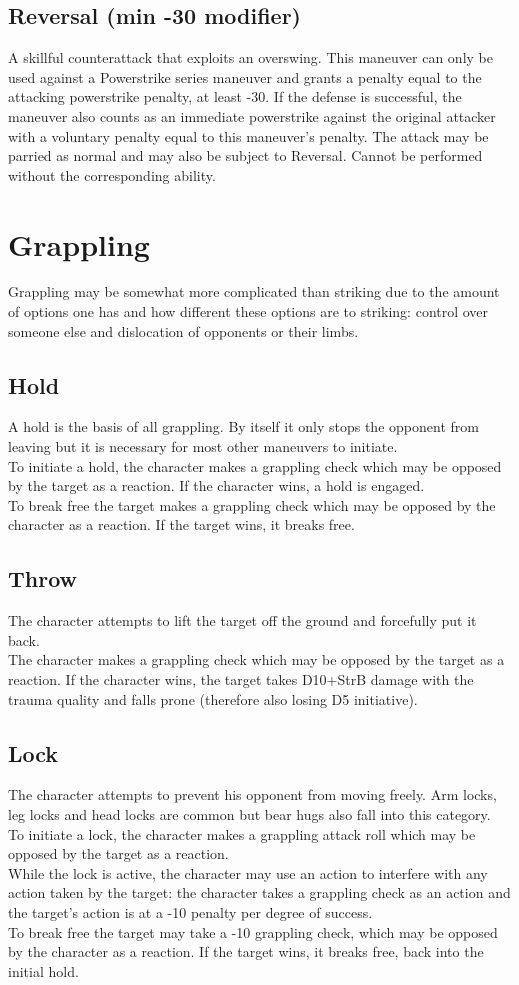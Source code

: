 \documentclass[12pt,a4paper,openany]{book}
\begin{document}
	\subsection*{Reversal (min -30 modifier)}
	A skillful counterattack that exploits an overswing. This maneuver can only be used against a Powerstrike series maneuver and grants a penalty equal to the attacking powerstrike penalty, at least -30. If the defense is successful, the maneuver also counts as an immediate powerstrike against the original attacker with a voluntary penalty equal to this maneuver’s penalty. The attack may be parried as normal and may also be subject to Reversal. Cannot be performed without the corresponding ability.
	\section{Grappling}
	Grappling may be somewhat more complicated than striking due to the amount of options one has and how different these options are to striking: control over someone else and dislocation of opponents or their limbs.
	\subsection*{Hold}
	A hold is the basis of all grappling. By itself it only stops the opponent from leaving but it is necessary for most other maneuvers to initiate.\\
	To initiate a hold, the character makes a grappling check which may be opposed by the target as a reaction. If the character wins, a hold is engaged.\\
	To break free the target makes a grappling check which may be opposed by the character as a reaction. If the target wins, it breaks free.
	\subsection*{Throw}
	The character attempts to lift the target off the ground and forcefully put it back.\\
	The character makes a grappling check which may be opposed by the target as a reaction. If the character wins, the target takes D10+StrB damage with the trauma quality and falls prone (therefore also losing D5 initiative).
	\subsection*{Lock}
	The character attempts to prevent his opponent from moving freely. Arm locks, leg locks and head locks are common but bear hugs also fall into this category.\\
	To initiate a lock, the character makes a grappling attack roll which may be opposed by the target as a reaction.\\
	While the lock is active, the character may use an action to interfere with any action taken by the target: the character takes a grappling check as an action and the target’s action is at a -10 penalty per degree of success.\\
	To break free the target may take a -10 grappling check, which may be opposed by the character as a reaction. If the target wins, it breaks free, back into the initial hold.
\end{document}
